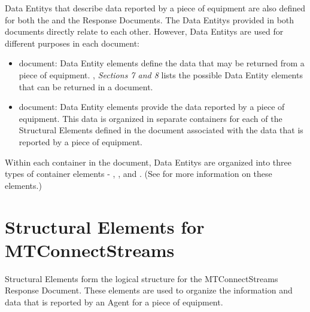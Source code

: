 \glspl{Data Entity} that describe data reported by a piece of equipment are also defined for both the  and the  \glspl{Response Document}.  The \glspl{Data Entity} provided in both documents directly relate to each other.  However, \glspl{Data Entity} are used for different purposes in each document:

\begin{itemize}
\item {} document: \gls{Data Entity} elements define the data that may be returned from a piece of equipment.  , \textit{Sections 7 and 8} lists the possible \gls{Data Entity} elements that can be returned in a  document.  

\item {} document: \gls{Data Entity} elements provide the data reported by a piece of equipment.  This data is organized in separate  containers for each of the \glspl{Structural Element} defined in the  document associated with the data that is reported by a piece of equipment.  
\end{itemize}

Within each  container in the  document, \glspl{Data Entity} are organized into three types of container elements - , , and .  (See  for more information on these elements.)

\section{Structural Elements for MTConnectStreams}
\label{sec:Structural Elements for MTConnectStreams}

\glspl{Structural Element} form the logical structure for the \gls{MTConnectStreams Response Document}.  These elements are used to organize the information and data that is reported by an \gls{Agent} for a piece of equipment.

